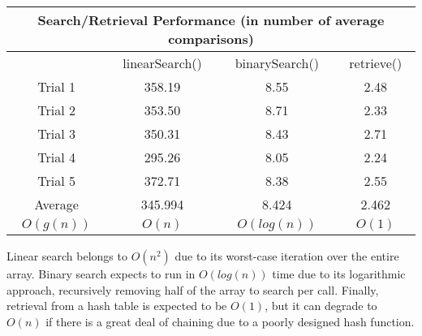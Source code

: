 \documentclass[letterpaper, 10pt]{article}
\begin{document}
\begin{center}
\begin{tabular}{|c||c|c|c|}
    \hline
    \multicolumn{4}{|c|}{Search/Retrieval Performance (in number of average comparisons)} \\
    \hline
    & linearSearch() & binarySearch() & retrieve() \\
    \hline\hline
    Trial 1 & 358.19 & 8.55 & 2.48 \\
    Trial 2 & 353.50 & 8.71 & 2.33 \\
    Trial 3 & 350.31 & 8.43 & 2.71 \\
    Trial 4 & 295.26 & 8.05 & 2.24 \\
    Trial 5 & 372.71 & 8.38 & 2.55 \\
    \hline
    Average & 345.994 & 8.424 & 2.462 \\
    \hline
    $O(g(n))$ & $O(n)$ & $O(log(n))$ & $O(1)$ \\
    \hline
\end{tabular}
\end{center}

\hspace{1.0em}Linear search belongs to $O(n^2)$ due to its worst-case iteration over the entire array. Binary search expects to run in $O(log(n))$ time due to its logarithmic approach, recursively removing half of the array to search per call. Finally, retrieval from a hash table is expected to be $O(1)$, but it can degrade to $O(n)$ if there is a great deal of chaining due to a poorly designed hash function.
\end{document}
